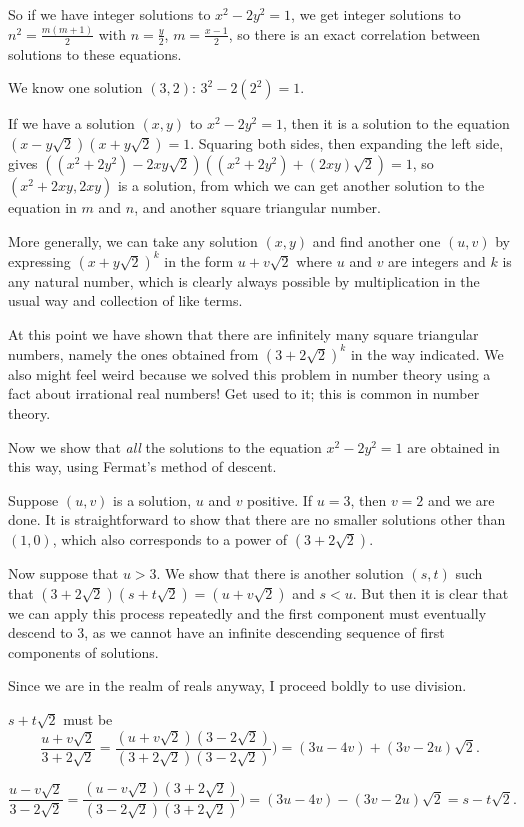 \documentclass[12pt]{article}
\begin{document}
So if we have integer solutions to $x^2-2y^2=1$, we get integer solutions to $n^2=\frac{m(m+1)}2$ with $n=\frac y2$, $m=\frac{x-1}2$, so there is an exact correlation between solutions to these equations.

We know one solution $(3,2)$:   $3^2-2(2^2)=1$.

If we have a solution $(x,y)$ to $x^2-2y^2=1$, then it is a solution to the equation $(x-y\sqrt2)(x+y\sqrt2)=1$.   Squaring both sides, then expanding the left side, gives $((x^2+2y^2)-2xy\sqrt2)((x^2+2y^2)+(2xy)\sqrt2)=1$, so $(x^2+2xy,2xy)$ is a solution, from which we can get another solution to the equation in $m$ and $n$, and another square triangular number.

More generally, we can take any solution $(x,y)$ and find another one $(u,v)$ by expressing $(x+ y\sqrt2)^k$ in the form $u+v\sqrt2$ where $u$ and $v$ are integers and $k$ is any natural number, which is clearly always possible by multiplication in the usual way and collection of like terms.

At this  point we have shown that there are infinitely many square triangular numbers, namely the ones obtained from $(3+2\sqrt2)^k$ in the way indicated.  We also might feel weird because we solved this problem in number theory using a fact about irrational real numbers!  Get used to it; this is common in number theory.

Now we show that {\em all\/} the solutions to the equation $x^2-2y^2=1$ are obtained in this way, using Fermat's method of descent.

Suppose $(u,v)$ is a solution, $u$ and $v$ positive.   If $u=3$, then $v=2$ and we are done.  It is straightforward to show that there are no smaller solutions
other than $(1,0)$, which also corresponds to a power of $(3+2\sqrt2)$.

Now suppose that $u>3$.  We show that there is another solution $(s,t)$ such that $(3+2\sqrt2)(s+t\sqrt2)=(u+v\sqrt2)$  and $s<u$.  But then it is clear that we can apply this process repeatedly and the first component must eventually descend to 3, as we cannot have an infinite descending sequence of first components of solutions.

Since we are in the realm of reals anyway, I proceed boldly to use division.

$s+t\sqrt2$ must be $$\frac{u+v\sqrt2}{3+2\sqrt2} = \frac{(u+v\sqrt2)(3-2\sqrt2)}{(3+2\sqrt2)(3-2\sqrt2)})=(3u-4v)+(3v-2u)\sqrt2.$$

$$\frac{u-v\sqrt2}{3-2\sqrt2} = \frac{(u-v\sqrt2)(3+2\sqrt2)}{(3-2\sqrt2)(3+2\sqrt2)})=(3u-4v)-(3v-2u)\sqrt2=s-t\sqrt 2.$$
\end{document}
